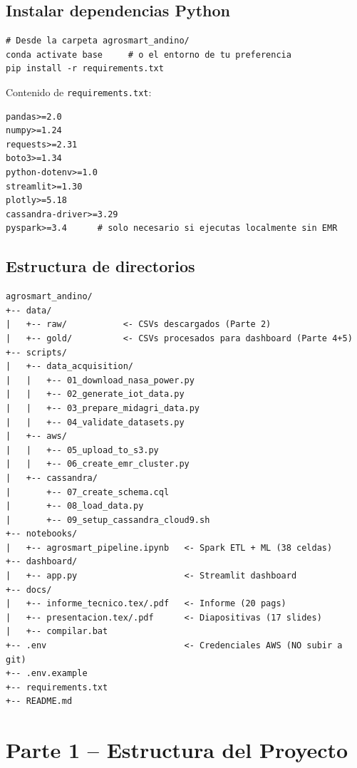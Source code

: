 \documentclass[11pt,a4paper]{article}
\begin{document}
\subsection{Instalar dependencias Python}

\begin{localbox}
\begin{lstlisting}[style=bash]
# Desde la carpeta agrosmart_andino/
conda activate base     # o el entorno de tu preferencia
pip install -r requirements.txt
\end{lstlisting}
\end{localbox}

Contenido de \texttt{requirements.txt}:
\begin{lstlisting}[style=python]
pandas>=2.0
numpy>=1.24
requests>=2.31
boto3>=1.34
python-dotenv>=1.0
streamlit>=1.30
plotly>=5.18
cassandra-driver>=3.29
pyspark>=3.4      # solo necesario si ejecutas localmente sin EMR
\end{lstlisting}

\subsection{Estructura de directorios}

\begin{lstlisting}
agrosmart_andino/
+-- data/
|   +-- raw/           <- CSVs descargados (Parte 2)
|   +-- gold/          <- CSVs procesados para dashboard (Parte 4+5)
+-- scripts/
|   +-- data_acquisition/
|   |   +-- 01_download_nasa_power.py
|   |   +-- 02_generate_iot_data.py
|   |   +-- 03_prepare_midagri_data.py
|   |   +-- 04_validate_datasets.py
|   +-- aws/
|   |   +-- 05_upload_to_s3.py
|   |   +-- 06_create_emr_cluster.py
|   +-- cassandra/
|       +-- 07_create_schema.cql
|       +-- 08_load_data.py
|       +-- 09_setup_cassandra_cloud9.sh
+-- notebooks/
|   +-- agrosmart_pipeline.ipynb   <- Spark ETL + ML (38 celdas)
+-- dashboard/
|   +-- app.py                     <- Streamlit dashboard
+-- docs/
|   +-- informe_tecnico.tex/.pdf   <- Informe (20 pags)
|   +-- presentacion.tex/.pdf      <- Diapositivas (17 slides)
|   +-- compilar.bat
+-- .env                           <- Credenciales AWS (NO subir a git)
+-- .env.example
+-- requirements.txt
+-- README.md
\end{lstlisting}

\section{Parte 1 -- Estructura del Proyecto}
\end{document}
